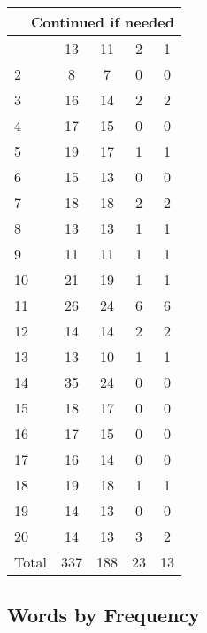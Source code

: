 \begin{center}
\begin{longtable}{l|c|c|c|c}
\hline \multicolumn{5}{|r|}{{Continued if needed}} \\ \hline
\endfoot 
1 & 13 & 11 & 2 & 1\\ \hline
2 & 8 & 7 & 0 & 0\\ \hline
3 & 16 & 14 & 2 & 2\\ \hline
4 & 17 & 15 & 0 & 0\\ \hline
5 & 19 & 17 & 1 & 1\\ \hline
6 & 15 & 13 & 0 & 0\\ \hline
7 & 18 & 18 & 2 & 2\\ \hline
8 & 13 & 13 & 1 & 1\\ \hline
9 & 11 & 11 & 1 & 1\\ \hline
10 & 21 & 19 & 1 & 1\\ \hline
11 & 26 & 24 & 6 & 6\\ \hline
12 & 14 & 14 & 2 & 2\\ \hline
13 & 13 & 10 & 1 & 1\\ \hline
14 & 35 & 24 & 0 & 0\\ \hline
15 & 18 & 17 & 0 & 0\\ \hline
16 & 17 & 15 & 0 & 0\\ \hline
17 & 16 & 14 & 0 & 0\\ \hline
18 & 19 & 18 & 1 & 1\\ \hline
19 & 14 & 13 & 0 & 0\\ \hline
20 & 14 & 13 & 3 & 2\\ \hline
\hline \hline
Total & 337 & 188 & 23 & 13



\end{longtable}
\end{center}

 
\subsection{Words by Frequency}


